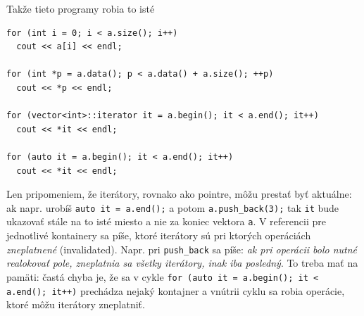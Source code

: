 \documentclass[10pt]{article}
\def\prg{\lstinline}
\def\ods{\vspace*{10pt}}
\begin{document}
\def\world(#1)#2#3{
  \draw[thick,#3](-1,-#1) -- (1.5,-#1) node[anchor=west]{{\tt #2}};
}

\def\kon(#1){ 
  \draw[draw=none] (0.2,-#1) rectangle node[align=center]{{\tt \ldots}} (1.2,1-#1);
}
  
\def\godot#1{\filldraw[blue,scale=0.6](#1) circle (0.4ex and 1.4ex);}


\ods Takže tieto programy robia to isté

\begin{lstlisting}
for (int i = 0; i < a.size(); i++) 
  cout << a[i] << endl;

for (int *p = a.data(); p < a.data() + a.size(); ++p) 
  cout << *p << endl;

for (vector<int>::iterator it = a.begin(); it < a.end(); it++)
  cout << *it << endl;

for (auto it = a.begin(); it < a.end(); it++)
  cout << *it << endl;
\end{lstlisting}

Len pripomeniem, že iterátory, rovnako ako pointre, môžu prestať byť aktuálne:
ak napr. urobíš \prg!auto it = a.end();! a potom \prg!a.push_back(3);! tak
{\tt it} bude ukazovať stále na to isté miesto a nie za koniec vektora {\tt a}.
V referencii pre jednotlivé kontainery sa píše, ktoré iterátory sú pri ktorých operáciách
{\em zneplatnené} (invalidated). Napr. pri \prg!push_back! sa píše: {\em ak pri operácii
bolo nutné realokovať pole, zneplatnia sa všetky iterátory, inak iba posledný}.
To treba mať na pamäti: častá chyba je, že sa v cykle 
\prg!for (auto it = a.begin(); it < a.end(); it++)! prechádza nejaký kontajner
a vnútrii cyklu sa robia operácie, ktoré môžu iterátory zneplatniť. 
\end{document}

